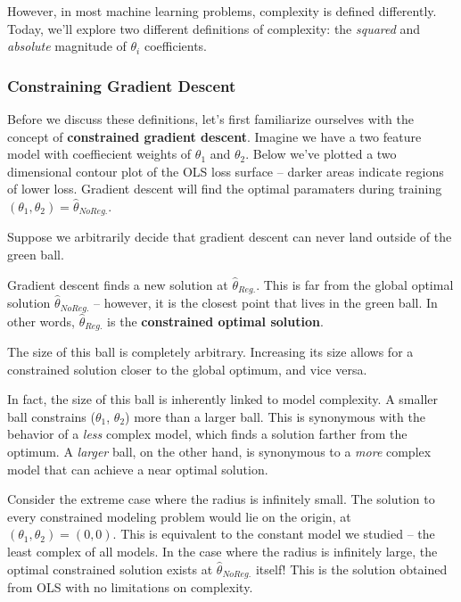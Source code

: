 \documentclass[
  letterpaper,
  DIV=11,
  numbers=noendperiod]{scrreprt}
\begin{document}
However, in most machine learning problems, complexity is defined
differently. Today, we'll explore two different definitions of
complexity: the \emph{squared} and \emph{absolute} magnitude of
\(\theta_i\) coefficients.

\hypertarget{constraining-gradient-descent}{%
\subsubsection{Constraining Gradient
Descent}\label{constraining-gradient-descent}}

Before we discuss these definitions, let's first familiarize ourselves
with the concept of \textbf{constrained gradient descent}. Imagine we
have a two feature model with coeffiecient weights of \(\theta_1\) and
\(\theta_2\). Below we've plotted a two dimensional contour plot of the
OLS loss surface -- darker areas indicate regions of lower loss.
Gradient descent will find the optimal paramaters during training
\((\theta_1, \theta_2) = \hat\theta_{No Reg.}\).

Suppose we arbitrarily decide that gradient descent can never land
outside of the green ball.

Gradient descent finds a new solution at \(\hat\theta_{Reg.}\). This is
far from the global optimal solution \(\hat\theta_{No Reg.}\) --
however, it is the closest point that lives in the green ball. In other
words, \(\hat\theta_{Reg.}\) is the \textbf{constrained optimal
solution}.

The size of this ball is completely arbitrary. Increasing its size
allows for a constrained solution closer to the global optimum, and vice
versa.

In fact, the size of this ball is inherently linked to model complexity.
A smaller ball constrains (\(\theta_1\), \(\theta_2\)) more than a
larger ball. This is synonymous with the behavior of a \emph{less}
complex model, which finds a solution farther from the optimum. A
\emph{larger} ball, on the other hand, is synonymous to a \emph{more}
complex model that can achieve a near optimal solution.

Consider the extreme case where the radius is infinitely small. The
solution to every constrained modeling problem would lie on the origin,
at \((\theta_1, \theta_2) = (0, 0)\). This is equivalent to the constant
model we studied -- the least complex of all models. In the case where
the radius is infinitely large, the optimal constrained solution exists
at \(\hat\theta_{No Reg.}\) itself! This is the solution obtained from
OLS with no limitations on complexity.
\end{document}
